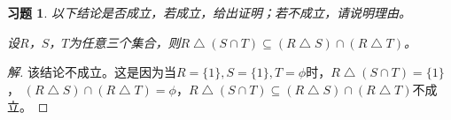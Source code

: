 \documentclass{article}
\begin{document}
\begin{CJK}{UTF8}{gbsn}
  \newtheorem*{Ex}{习题}
  \begin{Ex}
    以下结论是否成立，若成立，给出证明；若不成立，请说明理由。
    
      设$R$，$S$，$T$为任意三个集合，则$R\bigtriangleup (S\cap T) \subseteq (R\bigtriangleup S)\cap (R\bigtriangleup T)$。
\end{Ex}
\begin{proof}[解]
  该结论不成立。这是因为当$R=\{1\}, S=\{1\}, T = \phi$时，$R\bigtriangleup (S\cap T)=\{1\}$， $(R\bigtriangleup S)\cap (R\bigtriangleup T)=\phi$，$R\bigtriangleup (S\cap T)\subseteq (R\bigtriangleup S)\cap (R\bigtriangleup T)$不成立。
\end{proof}
\end{CJK}
\end{document}
